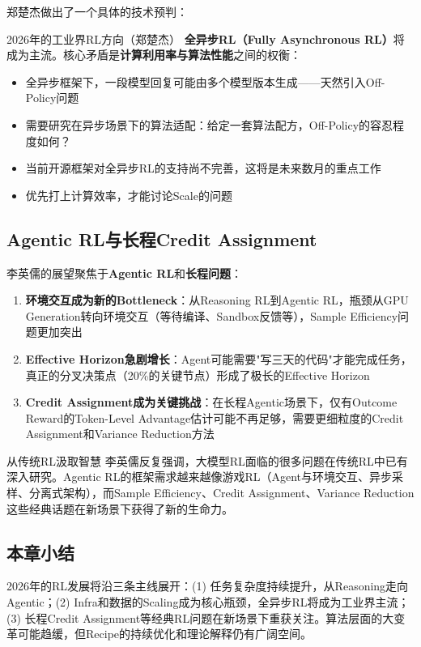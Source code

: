 郑楚杰做出了一个具体的技术预判：

\begin{importantbox}{2026年的工业界RL方向（郑楚杰）}
\textbf{全异步RL（Fully Asynchronous RL）}将成为主流。核心矛盾是\textbf{计算利用率与算法性能}之间的权衡：
\begin{itemize}
    \item 全异步框架下，一段模型回复可能由多个模型版本生成——天然引入Off-Policy问题
    \item 需要研究在异步场景下的算法适配：给定一套算法配方，Off-Policy的容忍程度如何？
    \item 当前开源框架对全异步RL的支持尚不完善，这将是未来数月的重点工作
    \item 优先打上计算效率，才能讨论Scale的问题
\end{itemize}
\end{importantbox}

\subsection{Agentic RL与长程Credit Assignment}

李英儒的展望聚焦于\textbf{Agentic RL}和\textbf{长程问题}：

\begin{enumerate}
    \item \textbf{环境交互成为新的Bottleneck}：从Reasoning RL到Agentic RL，瓶颈从GPU Generation转向环境交互（等待编译、Sandbox反馈等），Sample Efficiency问题更加突出
    \item \textbf{Effective Horizon急剧增长}：Agent可能需要"写三天的代码"才能完成任务，真正的分叉决策点（20\%的关键节点）形成了极长的Effective Horizon
    \item \textbf{Credit Assignment成为关键挑战}：在长程Agentic场景下，仅有Outcome Reward的Token-Level Advantage估计可能不再足够，需要更细粒度的Credit Assignment和Variance Reduction方法
\end{enumerate}

\begin{knowledgebox}{从传统RL汲取智慧}
李英儒反复强调，大模型RL面临的很多问题在传统RL中已有深入研究。Agentic RL的框架需求越来越像游戏RL（Agent与环境交互、异步采样、分离式架构），而Sample Efficiency、Credit Assignment、Variance Reduction这些经典话题在新场景下获得了新的生命力。
\end{knowledgebox}

\subsection{本章小结}

2026年的RL发展将沿三条主线展开：(1) 任务复杂度持续提升，从Reasoning走向Agentic；(2) Infra和数据的Scaling成为核心瓶颈，全异步RL将成为工业界主流；(3) 长程Credit Assignment等经典RL问题在新场景下重获关注。算法层面的大变革可能趋缓，但Recipe的持续优化和理论解释仍有广阔空间。



